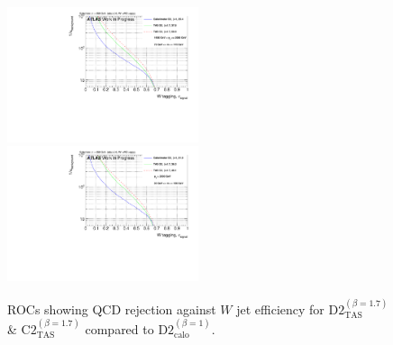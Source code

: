 \begin{figure}[H]
\bigskip
\includegraphics[width=0.5\textwidth]{sascha_input/Appendix/W_best/ROC_ALL_h_recoJet_D2_bin5.pdf} \hspace{1mm}
\includegraphics[width=0.5\textwidth]{sascha_input/Appendix/W_best/ROC_ALL_h_recoJet_D2_bin6.pdf}
\caption{\footnotesize{ROCs showing QCD rejection against $W$ jet efficiency for $\text{D2}_{\text{TAS}}^{(\beta=1.7)}$ \& $\text{C2}_{\text{TAS}}^{(\beta=1.7)}$ compared to $\text{D2}_{\text{calo}}^{(\beta=1)}$. }}
\end{figure}\label{fig:ROC_best_w}
